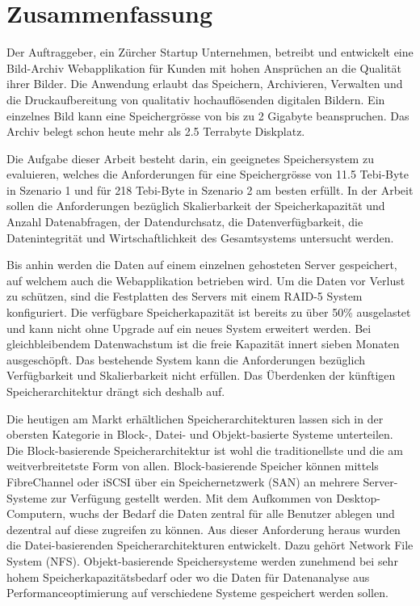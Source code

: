\cleardoublepage
\chapter{Zusammenfassung}

Der Auftraggeber, ein Zürcher Startup Unternehmen, betreibt und entwickelt eine Bild-Archiv Webapplikation für Kunden mit hohen Ansprüchen an die Qualität ihrer Bilder. Die Anwendung erlaubt das Speichern, Archivieren, Verwalten und die Druckaufbereitung von qualitativ hochauflösenden digitalen Bildern. Ein einzelnes Bild kann eine Speichergrösse von bis zu 2 Gigabyte beanspruchen. Das Archiv belegt schon heute mehr als 2.5 Terrabyte Diskplatz.

Die Aufgabe dieser Arbeit besteht darin, ein geeignetes Speichersystem zu evaluieren, welches die Anforderungen für eine Speichergrösse von 11.5 Tebi-Byte in Szenario 1 und für 218 Tebi-Byte in Szenario 2 am besten erfüllt. In der Arbeit sollen die Anforderungen bezüglich Skalierbarkeit der Speicherkapazität und Anzahl Datenabfragen, der Datendurchsatz, die Datenverfügbarkeit, die Datenintegrität und Wirtschaftlichkeit des Gesamtsystems untersucht werden.

Bis anhin werden die Daten auf einem einzelnen gehosteten Server gespeichert, auf welchem auch die Webapplikation betrieben wird. Um die Daten vor Verlust zu schützen, sind die Festplatten des Servers mit einem RAID-5 System konfiguriert. Die verfügbare Speicherkapazität ist bereits zu über 50\% ausgelastet und kann nicht ohne Upgrade auf ein neues System erweitert werden. Bei gleichbleibendem Datenwachstum ist die freie Kapazität innert sieben Monaten ausgeschöpft. Das bestehende System kann die Anforderungen bezüglich Verfügbarkeit und Skalierbarkeit nicht erfüllen. Das Überdenken der künftigen Speicherarchitektur drängt sich deshalb auf.
 
Die heutigen am Markt erhältlichen Speicherarchitekturen lassen sich in der obersten Kategorie in Block-, Datei- und Objekt-basierte Systeme unterteilen. Die Block-basierende Speicherarchitektur ist wohl die traditionellste und die am weitverbreitetste Form von allen. Block-basierende Speicher können mittels FibreChannel oder iSCSI über ein Speichernetzwerk (SAN) an mehrere Server-Systeme zur Verfügung gestellt werden. Mit dem Aufkommen von Desktop-Computern, wuchs der Bedarf die Daten zentral für alle Benutzer ablegen und dezentral auf diese zugreifen zu können. Aus dieser Anforderung heraus wurden die Datei-basierenden Speicherarchitekturen entwickelt. Dazu gehört Network File System (NFS). Objekt-basierende Speichersysteme werden zunehmend bei sehr hohem Speicherkapazitätsbedarf oder wo die Daten für Datenanalyse aus Performanceoptimierung auf verschiedene Systeme gespeichert werden sollen.


